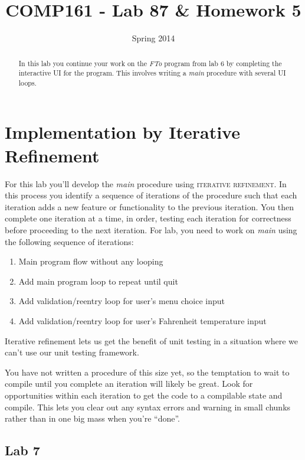 \documentclass[]{tufte-handout}
\title{COMP161 - Lab 87 \& Homework 5}
\author{}
\date{Spring 2014}
\begin{document}
\maketitle

\begin{abstract}
In this lab you continue your work on the \textit{FTo} program from lab 6 by completing the interactive UI for the program.  This involves writing a \textit{main} procedure with several UI loops.
\end{abstract}

\section{Implementation by Iterative Refinement}

For this lab you'll develop the \textit{main} procedure using \textsc{iterative refinement}. In this process you identify a sequence of  iterations of the procedure such that each iteration adds a new feature or functionality to the previous iteration.  You then complete one iteration at a time, in order, testing each iteration for correctness before proceeding to the next iteration. For lab, you need to work on \textit{main} using the following sequence of iterations:
\begin{enumerate}
\item Main program flow without any looping
\item Add main program loop to repeat until quit
\item Add validation/reentry loop for user's menu choice input
\item Add validation/reentry loop for user's Fahrenheit temperature input
\end{enumerate}
Iterative refinement lets us get the benefit of unit testing in a situation where we can't use our unit testing framework.

You have not written a procedure of this size yet, so the temptation to wait to compile until you complete an iteration will likely be great. Look for opportunities within each iteration to get the code to a compilable state and compile. This lets you clear out any syntax errors and warning in small chunks rather than in one big mass when you're ``done''.

\subsection{Lab 7 }
\end{document}
